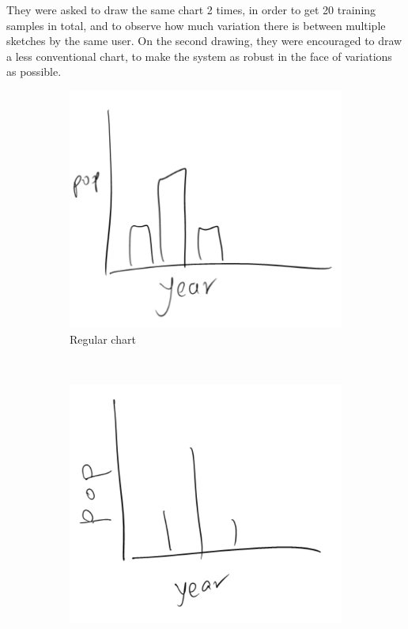 	They were asked to draw the same chart 2 times, in order to get 20 training samples in total, and to observe how much variation there is between multiple sketches by the same user. On the second drawing, they were encouraged to draw a less conventional chart, to make the system as robust in the face of variations as possible. 
		
	\begin{figure}[h]
        \centering
        \begin{subfigure}[b]{0.5\textwidth}
                \includegraphics[width=\textwidth]{collection1}
                \caption{Regular chart}
                \label{fig:regular}
        \end{subfigure}%
        ~ %
        \begin{subfigure}[b]{0.5\textwidth}
                \includegraphics[width=\textwidth]{collection2}

\end{subfigure}
\end{figure}
